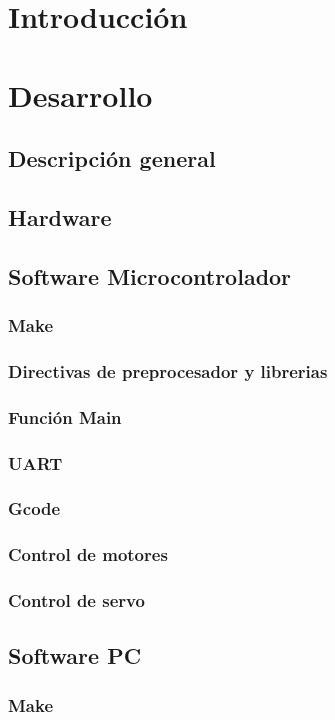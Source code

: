   \section{Introducción} %
  \section{Desarrollo}
  \subsection{Descripción general} %
  \subsection{Hardware} %
  \subsection{Software Microcontrolador}
  \subsubsection{Make}
  \subsubsection{Directivas de preprocesador y librerias}
  \subsubsection{Función Main}
  \subsubsection{UART}
  \subsubsection{Gcode}
  \subsubsection{Control de motores}
  \subsubsection{Control de servo}
  \subsection{Software PC}
  \subsubsection{Make}
